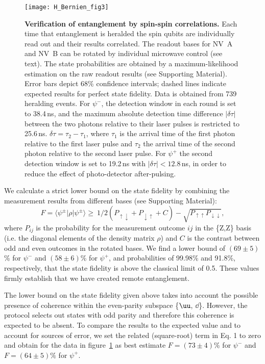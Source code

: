 \begin{figure}[tp]
	\centering
	\texttt{[image: H\_Bernien\_fig3]}
	\caption{\label{fig:LDE-fig3} \textbf{Verification of entanglement by spin-spin correlations.} Each time that entanglement is heralded the spin qubits are individually read out and their results correlated. The readout bases for NV~A and NV~B can be rotated by individual microwave control (see text). The state probabilities are obtained by a maximum-likelihood estimation on the raw readout results (see Supporting Material). Error bars depict 68\% confidence intervals; dashed lines indicate expected results for perfect state fidelity. Data is obtained from 739 heralding events. For $\psi^-$, the detection window in each round is set to 38.4$\,$ns, and the maximum absolute detection time difference $|\delta\tau|$ between the two photons relative to their laser pulses is restricted to 25.6$\,$ns. $\delta\tau=\tau_2-\tau_1$, where $\tau_1$ is the arrival time of the first photon relative to the first laser pulse and $\tau_2$ the arrival time of the second photon relative to the second laser pulse. For $\psi^+$ the second detection window is set to 19.2$\,$ns with $|\delta\tau|<12.8\,$ns, in order to reduce the effect of photo-detector after-pulsing.}
\end{figure}

We calculate a strict lower bound on the state fidelity by combining the measurement results from different bases (see Supporting Material):
\begin{equation}\label{eq:LDE_LB}
F = \langle\psi^\pm|\rho|\psi^\pm \rangle \geq \ 1/2(P_{\uparrow\downarrow}+P_{\downarrow\uparrow}+C)-\sqrt{P_{\uparrow\uparrow}P_{\downarrow\downarrow}},
\end{equation}
where $P_{ij}$ is the probability for the measurement outcome $ij$ in the \{Z,Z\} basis (i.e. the diagonal elements of the density matrix $\rho$) and $C$ is the contrast between odd and even outcomes in the rotated bases. We find a lower bound of $(69\pm5)$\% for $\psi^-$ and $(58\pm6)$\% for $\psi^+$, and probabilities of 99.98\% and 91.8\%, respectively, that the state fidelity is above the classical limit of 0.5. These values firmly establish that we have created remote entanglement.

The lower bound on the state fidelity given above takes into account the possible presence of coherence within the even-parity subspace \{$\uu$, $\dd$\}. However, the protocol selects out states with odd parity and therefore this coherence is expected to be absent. To compare the results to the expected value and to account for sources of error, we set the related (square-root) term in Eq. 1 to zero and obtain for the data in figure~\ref{fig:LDE-fig3} as best estimate $F=(73\pm4)$\% for $\psi^-$ and $F=(64\pm5)\%$ for $\psi^+$.

